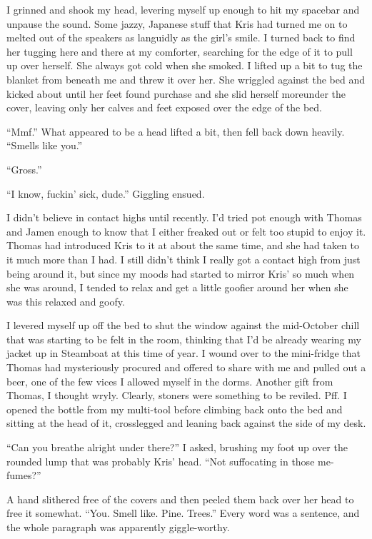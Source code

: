 I grinned and shook my head, levering myself up enough to hit my spacebar and unpause the sound.  Some jazzy, Japanese stuff that Kris had turned me on to melted out of the speakers as languidly as the girl's smile.  I turned back to find her tugging here and there at my comforter, searching for the edge of it to pull up over herself.  She always got cold when she smoked.  I lifted up a bit to tug the blanket from beneath me and threw it over her.  She wriggled against the bed and kicked about until her feet found purchase and she slid herself moreunder the cover, leaving only her calves and feet exposed over the edge of the bed.

``Mmf.''  What appeared to be a head lifted a bit, then fell back down heavily.  ``Smells like you.''

``Gross.''

``I know, fuckin' sick, dude.''  Giggling ensued.

I didn't believe in contact highs until recently.  I'd tried pot enough with Thomas and Jamen enough to know that I either freaked out or felt too stupid to enjoy it.  Thomas had introduced Kris to it at about the same time, and she had taken to it much more than I had.  I still didn't think I really got a contact high from just being around it, but since my moods had started to mirror Kris' so much when she was around, I tended to relax and get a little goofier around her when she was this relaxed and goofy.

I levered myself up off the bed to shut the window against the mid-October chill that was starting to be felt in the room, thinking that I'd be already wearing my jacket up in Steamboat at this time of year.  I wound over to the mini-fridge that Thomas had mysteriously procured and offered to share with me and pulled out a beer, one of the few vices I allowed myself in the dorms.  Another gift from Thomas, I thought wryly.  Clearly, stoners were something to be reviled.  Pff.  I opened the bottle from my multi-tool before climbing back onto the bed and sitting at the head of it, crosslegged and leaning back against the side of my desk.

``Can you breathe alright under there?'' I asked, brushing my foot up over the rounded lump that was probably Kris' head.  ``Not suffocating in those me-fumes?''

A hand slithered free of the covers and then peeled them back over her head to free it somewhat.  ``You.  Smell like.  Pine.  Trees.''  Every word was a sentence, and the whole paragraph was apparently giggle-worthy.

